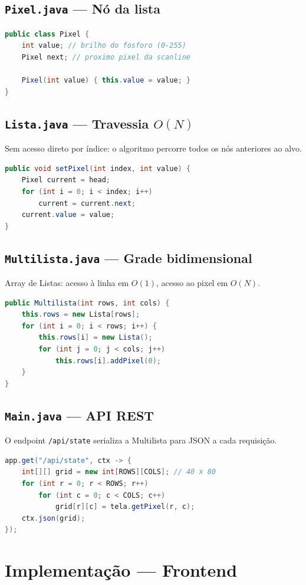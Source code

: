 \documentclass[12pt, a4paper]{article}
\begin{document}
\subsection{\texttt{Pixel.java} — Nó da lista}
\begin{lstlisting}[language=Java]
public class Pixel {
    int value; // brilho do fosforo (0-255)
    Pixel next; // proximo pixel da scanline

    Pixel(int value) { this.value = value; }
}
\end{lstlisting}

\subsection{\texttt{Lista.java} — Travessia $O(N)$}
Sem acesso direto por índice: o algoritmo percorre todos os nós anteriores ao alvo.
\begin{lstlisting}[language=Java]
public void setPixel(int index, int value) {
    Pixel current = head;
    for (int i = 0; i < index; i++)
        current = current.next;
    current.value = value;
}
\end{lstlisting}

\subsection{\texttt{Multilista.java} — Grade bidimensional}
Array de Listas: acesso à linha em $O(1)$, acesso ao pixel em $O(N)$.
\begin{lstlisting}[language=Java]
public Multilista(int rows, int cols) {
    this.rows = new Lista[rows];
    for (int i = 0; i < rows; i++) {
        this.rows[i] = new Lista();
        for (int j = 0; j < cols; j++)
            this.rows[i].addPixel(0);
    }
}
\end{lstlisting}

\subsection{\texttt{Main.java} — API REST}
O endpoint \texttt{/api/state} serializa a Multilista para JSON a cada requisição.
\begin{lstlisting}[language=Java]
app.get("/api/state", ctx -> {
    int[][] grid = new int[ROWS][COLS]; // 40 x 80
    for (int r = 0; r < ROWS; r++)
        for (int c = 0; c < COLS; c++)
            grid[r][c] = tela.getPixel(r, c);
    ctx.json(grid);
});
\end{lstlisting}

\section{Implementação — Frontend}
\end{document}
